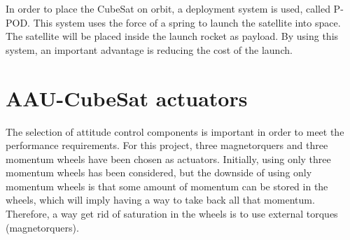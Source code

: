 In order to place the CubeSat on orbit, a deployment system is used, called P-POD. This system uses the force of a spring to launch the satellite into space. The satellite will be placed inside the launch rocket as payload. By using this system, an important advantage is reducing the cost of the launch. \cite{PPOD}
%
\section{AAU-CubeSat actuators}
The selection of attitude control components is important in order to meet the performance requirements. For this project, three magnetorquers and three momentum wheels have been chosen as actuators. Initially, using only three momentum wheels has been considered, but the downside of using only momentum wheels is that some amount of momentum can be stored in the wheels, which will imply having a way to take back all that momentum. Therefore, a way get rid of saturation in the wheels is to use external torques (magnetorquers). 

